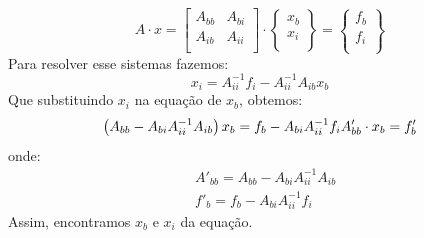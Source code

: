 \begin{equation}
A\cdot x  = \left[ 
\begin{matrix} 
A_{bb} & A_{bi} \\
A_{ib} & A_{ii} \\
\end{matrix}\right] \cdot \left\{
\begin{matrix} x_b \\ x_i \\ 
\end{matrix}\right\} = 
\left\{\begin{matrix} f_b \\ f_i \\\end{matrix}\right\} 
\end{equation}
Para resolver esse sistemas fazemos:
\begin{equation}
x_i = A_{ii}^{-1} f_i - A_{ii}^{-1} A_{ib} x_b
\end{equation}
Que substituindo $x_i$ na equação de  $x_b$, obtemos:
\begin{equation}
\left( A_{bb} - A_{bi}A_{ii}^{-1} A_{ib} \right) x_b = f_b - A_{bi}A_{ii}^{-1} f_i\\
A'_{bb} \cdot x_b = f'_b
\end{equation}
onde:
\begin{align}
& A'_{bb} = A_{bb} - A_{bi}A_{ii}^{-1} A_{ib}\\ 
& f'_b = f_b - A_{bi}A_{ii}^{-1} f_i
\end{align}
Assim, encontramos $x_b$ e $x_i$ da equação.

